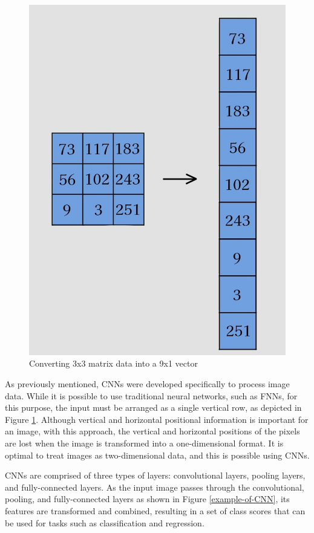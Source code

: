 \begin{figure}[b]
  \centering
  \includegraphics[width=70truemm]{resources/2_background/dimension.png}
  \caption{
    Converting 3x3 matrix data into a 9x1 vector
  }
  \label{converting-imageddata}
\end{figure}
\clearpage
As previously mentioned, CNNs were developed specifically to process image data.
While it is possible to use traditional neural networks, such as FNNs,
for this purpose, the input must be arranged as a single vertical row, as depicted
in Figure \ref{converting-imageddata}. 
Although vertical and horizontal positional information is important for an image,
with this approach, the vertical and horizontal positions of the pixels are lost 
when the image is transformed into a one-dimensional format. It is optimal to 
treat images as two-dimensional data, and this is possible using CNNs.

CNNs are comprised of three types of layers:
convolutional layers, pooling layers, and fully-connected layers.
As the input image passes through the convolutional, pooling, and fully-connected
layers as shown in Figure \ref{example-of-CNN}, its features are transformed and combined, resulting 
in a set of class scores that can be used for tasks such as classification and 
regression. 

